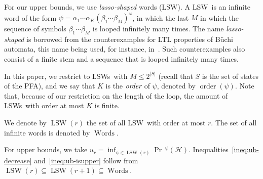 \documentclass[final,3p,times,twocolumn]{elsarticle}
\theoremstyle{plain}
\theoremstyle{definition}
\newcommand{\states}{S}
\newcommand{\smbol}{\alpha}
\newcommand{\smbolp}{\beta}
\newcommand{\phit}{\mathcal{H}}
\newcommand{\iword}{\psi}
\DeclareMathOperator{\prWord}{Pr}
\newcommand{\ub}{u}
\newcommand{\iter}{r}
\newcommand{\card}[1]{|{#1}|}
\DeclareMathOperator{\orderWord}{order}
\newcommand{\order}[1]{\orderWord(#1)}
\newcommand{\lsw}{LSW}
\newcommand{\lsws}{LSWs}
\DeclareMathOperator{\allwords}{Words}
\DeclareMathOperator{\lswWord}{LSW}
\newcommand{\alllsw}[1]{\lswWord({#1})}
\newcommand{\pr}{\prWord\,\!}
\begin{document}
For our upper bounds, we use \emph{lasso-shaped} words (\lsw). A \lsw\ is an
infinite word of the form
$\iword = \smbol_{1} \cdots \smbol_{K}
			( \smbolp_{1} \cdots \smbolp_{M} )^{\omega}$, in which the last $M$
in which the sequence of symbols $\smbolp_{1} \cdots \smbolp_{M}$ is looped
infinitely many times. The name \emph{lasso-shaped} is borrowed from the
counterexamples for LTL properties of B\"uchi automata, this name being used,
for instance, in~\cite{DBLP:conf/tacas/SchuppanB05}. Such counterexamples also
consist of a finite stem and a sequence that is looped infinitely many times.

In this paper, we restrict to \lsws\ with $M \leq 2^{\card{\states}}$ (recall
that $\states$ is the set of states of the PFA), and we say that $K$ is the
$\emph{order}$ of $\iword$, denoted by $\order{\iword}$. Note that, because of
our restriction on the length of the loop, the amount of \lsws\ with order at
most $K$ is finite.

We denote by $\alllsw{\iter}$ the set of all \lsw\ with order at most $\iter$.
The set of all infinite words is denoted by $\allwords$.

For upper bounds, we take
$\ub_{\iter} = \inf_{\iword \in \alllsw{\iter}} \pr^{\iword}(\phit)$.
Inequalities~\ref{ineq:ub-decrease} and~\ref{ineq:ub-isupper} follow from
$\alllsw{\iter} \subseteq \alllsw{\iter+1} \subseteq \allwords$.
\end{document}
